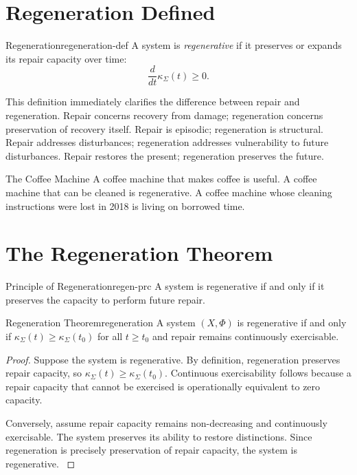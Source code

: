 \documentclass[12pt,twoside,openright]{book}
\newcounter{exercise}[chapter]
\begin{document}
\section{Regeneration Defined}
\label{sec:ch11-defined}

\begin{definition}{Regeneration}{regeneration-def}
  A system is \emph{regenerative} if it preserves or
  expands its repair capacity over time:
  \[
    \frac{d}{dt}\kappa_\Sigma(t) \ge 0.
  \]
\end{definition}

This definition immediately clarifies the difference
between repair and regeneration. Repair concerns recovery
from damage; regeneration concerns preservation of recovery
itself. Repair is episodic; regeneration is structural.
Repair addresses disturbances; regeneration addresses
vulnerability to future disturbances. Repair restores the
present; regeneration preserves the future.

\begin{distinctionaside}{The Coffee Machine}
A coffee machine that makes coffee is useful. A coffee
machine that can be cleaned is regenerative. A coffee machine
whose cleaning instructions were lost in 2018 is living on
borrowed time.
\end{distinctionaside}

\section{The Regeneration Theorem}
\label{sec:ch11-theorem}

\begin{principle}{Principle of Regeneration}{regen-prc}
  A system is regenerative if and only if it preserves the
  capacity to perform future repair.
\end{principle}

\begin{theorem}{Regeneration Theorem}{regeneration}
  A system $(X,\Phi)$ is regenerative if and only if
  $\kappa_\Sigma(t)\ge\kappa_\Sigma(t_0)$ for all $t\ge t_0$
  and repair remains continuously exercisable.
\end{theorem}

\begin{proof}
  Suppose the system is regenerative. By definition,
  regeneration preserves repair capacity, so
  $\kappa_\Sigma(t)\ge\kappa_\Sigma(t_0)$. Continuous
  exercisability follows because a repair capacity that
  cannot be exercised is operationally equivalent to zero
  capacity.

  Conversely, assume repair capacity remains non-decreasing
  and continuously exercisable. The system preserves its
  ability to restore distinctions. Since regeneration is
  precisely preservation of repair capacity, the system is
  regenerative. \parencite{holling1973,gunderson2002}
\end{proof}
\end{document}
